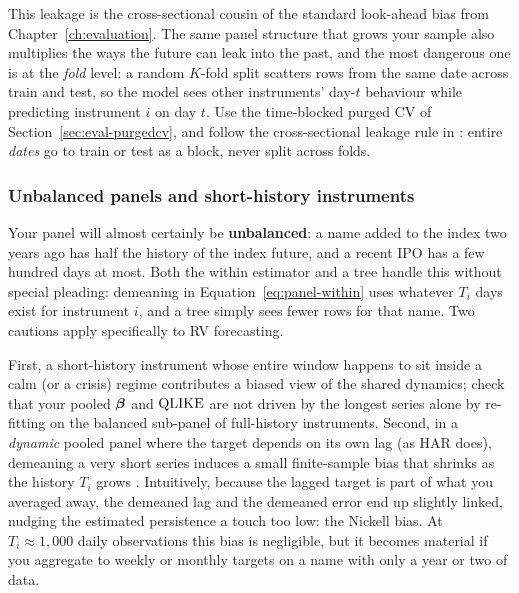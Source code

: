 \begin{projectconnection}
This leakage is the cross-sectional cousin of the standard look-ahead bias from
Chapter~\ref{ch:evaluation}.  The same panel structure that grows your sample
also multiplies the ways the future can leak into the past, and the most
dangerous one is at the \emph{fold} level: a random $K$-fold split scatters rows
from the same date across train and test, so the model sees other instruments'
day-$t$ behaviour while predicting instrument $i$ on day $t$.  Use the
time-blocked purged CV of Section~\ref{sec:eval-purgedcv}, and follow the
cross-sectional leakage rule in : entire
\emph{dates} go to train or test as a block, never split across folds.
\end{projectconnection}

\subsubsection*{Unbalanced panels and short-history instruments}

Your panel will almost certainly be \textbf{unbalanced}: a name added to the
index two years ago has half the history of the index future, and a recent IPO
has a few hundred days at most.  Both the within estimator and a tree handle this
without special pleading: demeaning in Equation~\eqref{eq:panel-within} uses
whatever $T_i$ days exist for instrument $i$, and a tree simply sees fewer rows
for that name.  Two cautions apply specifically to RV forecasting.

\begin{warning}
First, a short-history instrument whose entire window happens to sit inside a
calm (or a crisis) regime contributes a biased view of the shared dynamics;
check that your pooled $\bm{\beta}$ and $\operatorname{QLIKE}$ are not driven by the longest series
alone by re-fitting on the balanced sub-panel of full-history instruments.
Second, in a \emph{dynamic} pooled panel where the target depends on its own lag
(as HAR does), demeaning a very short series induces a small finite-sample bias
that shrinks as the history $T_i$ grows \citep{Nickell1981}.  Intuitively, because
the lagged target is part of what you averaged away, the demeaned lag and the
demeaned error end up slightly linked, nudging the estimated persistence a touch
too low: the Nickell bias.  At $T_i \approx 1{,}000$ daily
observations this bias is negligible, but it becomes material if you aggregate to
weekly or monthly targets on a name with only a year or two of data.
\end{warning}


